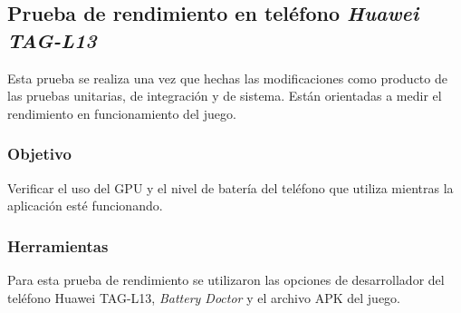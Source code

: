 \subsection{Prueba de rendimiento en teléfono \textit{Huawei TAG-L13}}
Esta prueba se realiza una vez que hechas las modificaciones como producto de las pruebas unitarias, de integración y de sistema. Están orientadas a medir
el rendimiento en funcionamiento del juego.

\subsubsection{Objetivo}
Verificar el uso del GPU y el nivel de batería del teléfono que utiliza mientras la aplicación esté funcionando.

\subsubsection{Herramientas}
Para esta prueba de rendimiento se utilizaron las opciones de desarrollador del
teléfono Huawei TAG-L13, \textit{Battery Doctor} y el archivo APK del juego.


